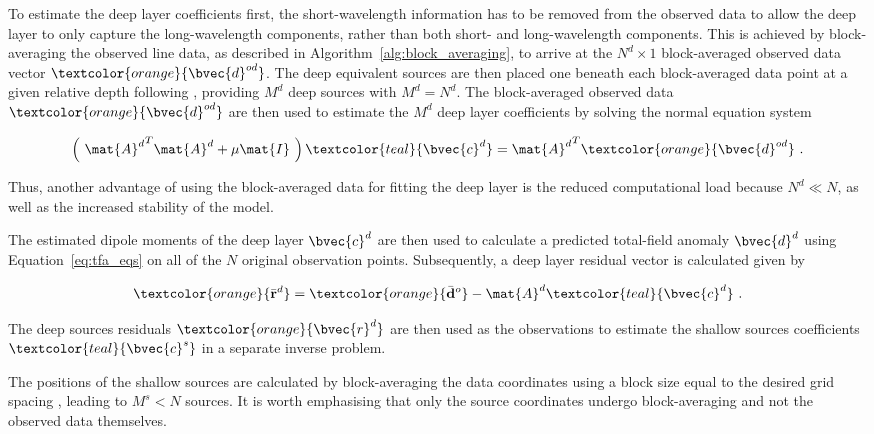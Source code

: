 To estimate the deep layer coefficients first, the short-wavelength information has to be removed from the observed data to allow the deep layer to only capture the long-wavelength components, rather than both short- and long-wavelength components. This is achieved by block-averaging the observed line data, as described in Algorithm~\ref{alg:block_averaging}, to arrive at the $N^d \times 1$ block-averaged observed data vector $\textcolor{orange}{\bvec{d}^{od}}$. The deep equivalent sources are then placed one beneath each block-averaged data point at a given relative depth following \citet{Soler2021}, providing $M^d$ deep sources with $M^d = N^d$. The block-averaged observed data $\textcolor{orange}{\bvec{d}^{od}}$ are then used to estimate the $M^d$ deep layer coefficients by solving the normal equation system

\begin{equation}
    \left(\ {\mat{A}^d}^T \mat{A}^d + \mu \mat{I}\ \right) 
    \textcolor{teal}{\bvec{c}^d} =
    {\mat{A}^d}^T\textcolor{orange}{\bvec{d}^{od}}
    \ .
\end{equation}

\noindent
Thus, another advantage of using the block-averaged data for fitting the deep layer is the reduced computational load because $N^d \ll N$, as well as the increased stability of the model. 

The estimated dipole moments of the deep layer \textcolor{teal}{$\bvec{c}^d$} are then used to calculate a predicted total-field anomaly \textcolor{orange}{$\bvec{d}^d$} using Equation~\ref{eq:tfa_eqs} on all of the $N$ original observation points. Subsequently, a deep layer residual vector is calculated given by

\begin{equation}
    \textcolor{orange}{\bar{\mathbf{r}}^d} = 
    \textcolor{orange}{\bar{\mathbf{d}}^o} - \mat{A}^d \textcolor{teal}{\bvec{c}^d}
    \ .
    \label{eq:deep_residual}
\end{equation}

\noindent
The deep sources residuals $\textcolor{orange}{\bvec{r}^d}$ are then used as the observations to estimate the shallow sources coefficients $\textcolor{teal}{\bvec{c}^s}$ in a separate inverse problem. 

The positions of the shallow sources are calculated by block-averaging the data coordinates using a block size equal to the desired grid spacing \citep{Soler2021}, leading to $M^s < N$ sources. It is worth emphasising that only the source coordinates undergo block-averaging and not the observed data themselves. 


